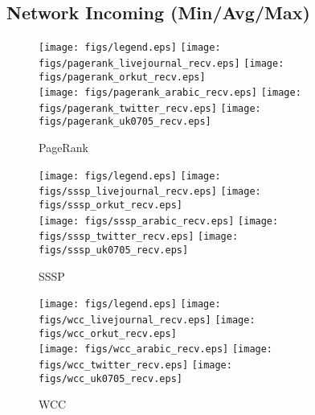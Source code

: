 \documentclass{article}
\newcommand{\bline}[1][1]{\vspace{#1\baselineskip}}
\begin{document}
\pagebreak
\subsection{Network Incoming (Min/Avg/Max)}
\begin{figure}[!h]
  \bline[1]
  \centering
  \texttt{[image: figs/legend.eps]}\hspace{3em}%
  \texttt{[image: figs/pagerank\_livejournal\_recv.eps]}\hspace{1em}%
  \texttt{[image: figs/pagerank\_orkut\_recv.eps]}\\
  \texttt{[image: figs/pagerank\_arabic\_recv.eps]}\hspace{1em}%
  \texttt{[image: figs/pagerank\_twitter\_recv.eps]}\hspace{1em}%
  \texttt{[image: figs/pagerank\_uk0705\_recv.eps]}
  \caption{PageRank}
\end{figure}

\begin{figure}[!h]
  \bline[3.5]
  \centering
  \texttt{[image: figs/legend.eps]}\hspace{3em}%
  \texttt{[image: figs/sssp\_livejournal\_recv.eps]}\hspace{1em}%
  \texttt{[image: figs/sssp\_orkut\_recv.eps]}\\
  \texttt{[image: figs/sssp\_arabic\_recv.eps]}\hspace{1em}%
  \texttt{[image: figs/sssp\_twitter\_recv.eps]}\hspace{1em}%
  \texttt{[image: figs/sssp\_uk0705\_recv.eps]}
  \caption{SSSP}
\end{figure}

\begin{figure}[!h]
  \bline[3.5]
  \centering
  \texttt{[image: figs/legend.eps]}\hspace{3em}%
  \texttt{[image: figs/wcc\_livejournal\_recv.eps]}\hspace{1em}%
  \texttt{[image: figs/wcc\_orkut\_recv.eps]}\\
  \texttt{[image: figs/wcc\_arabic\_recv.eps]}\hspace{1em}%
  \texttt{[image: figs/wcc\_twitter\_recv.eps]}\hspace{1em}%
  \texttt{[image: figs/wcc\_uk0705\_recv.eps]}
  \caption{WCC}
\end{figure}
\end{document}
